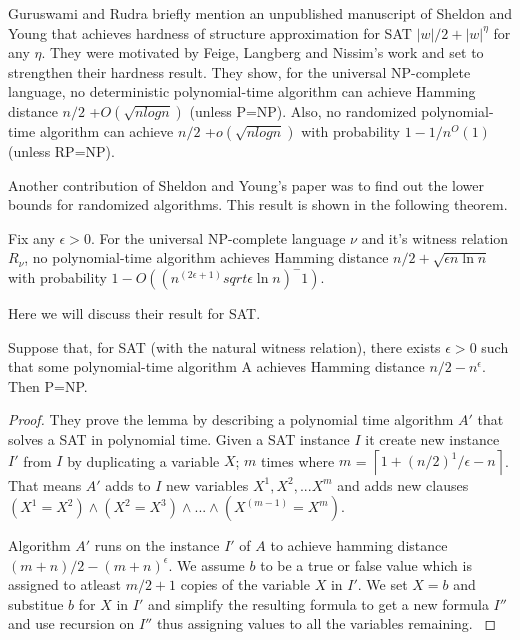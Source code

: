 Guruswami and Rudra briefly mention an unpublished manuscript of Sheldon and Young \cite{SY03} that achieves hardness of structure approximation for SAT $|w|/2+|w|^\eta$ for any $\eta$. They were motivated by Feige, Langberg and Nissim's work \cite{FLN00} and set to strengthen their hardness result. They show, for the universal NP-complete language, no deterministic
polynomial-time algorithm can achieve Hamming distance $n/2$ +$O(\sqrt{nlogn})$ (unless P=NP). Also, no randomized polynomial-time algorithm can achieve $n/2$ +$o(\sqrt{nlogn})$ with probability $1 - 1/n^O(1)$(unless RP=NP)\cite{SY03}.

Another contribution of Sheldon and Young's paper was to find out the lower bounds for randomized algorithms. This result is shown in the following theorem.

\begin{theorem}
Fix any $\epsilon > 0$. For the universal NP-complete language $\nu$ and it's witness relation $R_\nu$, no polynomial-time algorithm achieves Hamming distance $n/2+\sqrt{\epsilon n\ln n}$ with probability $1-O((n^(2\epsilon+1)sqrt{\epsilon \ln n})^-1)$. 
\end{theorem}

Here we will discuss their result for SAT. 

\begin{lemma}
Suppose that, for SAT (with the natural witness relation), there
exists $\epsilon > 0$ such that some polynomial-time algorithm A achieves Hamming
distance $n/2 - n^\epsilon$. Then P=NP.
\end{lemma}

\begin{proof}
They prove the lemma by describing a polynomial time algorithm $A'$ that solves a SAT in polynomial time. Given a SAT instance $I$ it create new instance $I'$ from $I$ by duplicating a variable $X$; $m$ times where $m$ = $\left\lceil 1+ (n/2)^1/\epsilon - n\right\rceil$. That means $A'$ adds to $I$ new variables ${X^1,X^2,...X^m}$ and adds new clauses $(X^1=X^2)\wedge (X^2=X^3)\wedge...\wedge (X^(m-1)=X^m)$. 

Algorithm $A'$ runs on the instance $I'$ of $A$ to achieve hamming distance $(m+n)/2-(m+n)^\epsilon$. We assume $b$ to be a true or false value which is assigned to atleast $m/2+1$ copies of the variable $X$ in $I'$. We set $X=b$ and substitue $b$ for $X$ in $I'$ and simplify the resulting formula to get a new formula $I''$ and use recursion on $I''$ thus assigning values to all the variables remaining. \cite{SY03}
\end{proof}



